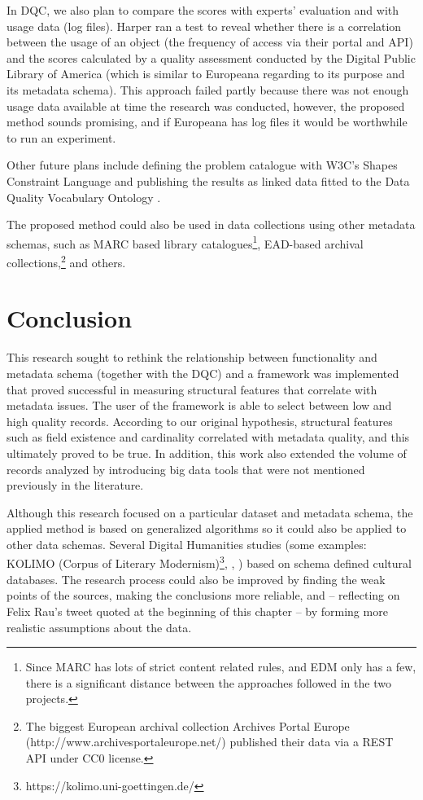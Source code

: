 In DQC, we also plan to compare the scores with experts’ evaluation and with usage data (log files). Harper ran a test to reveal whether there is a correlation between the usage of an object (the frequency of access via their portal and API) and the scores calculated by a quality assessment conducted by the Digital Public Library of America (which is similar to Europeana regarding to its purpose and its metadata schema). This approach failed partly because there was not enough usage data available at time the research was conducted, however, the proposed method sounds promising, and if Europeana has log files it would be worthwhile to run an experiment.

Other future plans include defining the problem catalogue with W3C’s Shapes Constraint Language \cite{knublauch2017} and publishing the results as linked data fitted to the Data Quality Vocabulary Ontology \cite{albertoni-isaac2016}.

The proposed method could also be used in data collections using other metadata schemas, such as MARC based library catalogues\footnote{Since MARC has lots of strict content related rules, and EDM only has a few, there is a significant distance between the approaches followed in the two projects.}, EAD-based archival collections,\footnote{The biggest European archival collection Archives Portal Europe (http://www.archivesportaleurope.net/) published their data via a REST API under CC0 license.} and others.

\section{Conclusion}

This research sought to rethink the relationship between functionality and metadata schema (together with the DQC) and a framework was implemented that proved successful in measuring structural features that correlate with metadata issues. The user of the framework is able to select between low and high quality records. According to our original hypothesis, structural features such as field existence and cardinality correlated with metadata quality, and this ultimately proved to be true. In addition, this work also extended the volume of records analyzed by introducing big data tools that were not mentioned previously in the literature.

Although this research focused on a particular dataset and metadata schema, the applied method is based on generalized algorithms so it could also be applied to other data schemas. Several Digital Humanities studies (some examples: KOLIMO (Corpus of Literary Modernism)\footnote{https://kolimo.uni-goettingen.de/}, \cite{strezoski2017}, \cite{schmidt2017}) based on schema defined cultural databases. The research process could also be improved by finding the weak points of the sources, making the conclusions more reliable, and -- reflecting on Felix Rau's tweet quoted at the beginning of this chapter -- by forming more realistic assumptions about the data.

